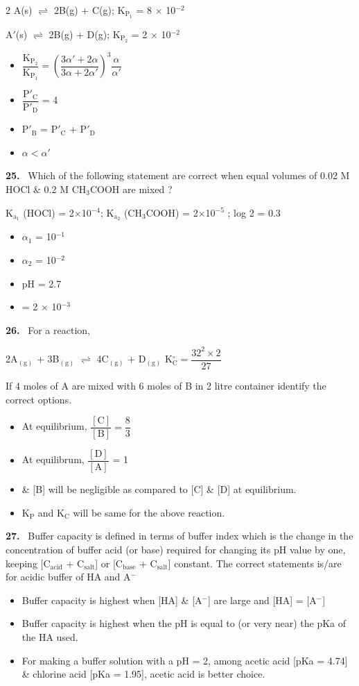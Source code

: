 \documentclass[10pt]{extarticle}
\newcommand{\qn}[1]{\par\smallskip\noindent\textbf{#1.}~}
\newenvironment{qoptions}{\begin{itemize}[leftmargin=1.8em,itemsep=1pt,topsep=2pt,label={}]}{\end{itemize}}
\newcommand{\opt}[2]{\item[(#1)] #2}
\begin{document}
\begin{multicols}{2}
A(s) $\rightleftharpoons$ 2B(g) + C(g); \quad K$_{\mathrm P_1}$ = 8 $\times$ 10$^{-2}$\par
A$'$(s) $\rightleftharpoons$ 2B(g) + D(g); \quad K$_{\mathrm P_2}$ = 2 $\times$ 10$^{-2}$
\begin{qoptions}
\opt{A}{$\dfrac{\mathrm K_{\mathrm P_2}}{\mathrm K_{\mathrm P_1}}=\left(\dfrac{3\alpha'+2\alpha}{3\alpha+2\alpha'}\right)^3\dfrac\alpha{\alpha'}$}
\opt{B}{$\dfrac{\mathrm P'_\mathrm C}{\mathrm P'_\mathrm D}$ = 4}
\opt{C}{P$'_\mathrm B$ = P$'_\mathrm C$ + P$'_\mathrm D$}
\opt{D}{$\alpha<\alpha'$}
\end{qoptions}
\qn{25} Which of the following statement are correct when equal volumes of 0.02 M HOCl \& 0.2 M CH$_3$COOH are mixed ?\par
K$_{\mathrm a_1}$ (HOCl) = 2$\times$10$^{-4}$; K$_{\mathrm a_2}$ (CH$_3$COOH) = 2$\times$10$^{-5}$ ; log 2 = 0.3
\begin{qoptions}
\opt{A}{$\alpha_1$ = 10$^{-1}$}
\opt{B}{$\alpha_2$ = 10$^{-2}$}
\opt{C}{pH = 2.7}
\opt{D}{[H$^+$] = 2 $\times$ 10$^{-3}$}
\end{qoptions}
\qn{26} For a reaction,\par
2A$_{(\mathrm g)}$ + 3B$_{(\mathrm g)}$ $\rightleftharpoons$ 4C$_{(\mathrm g)}$ + D$_{(\mathrm g)}$ \hfill K$^\circ_\mathrm C=\dfrac{32^2\times2}{27}$\par
If 4 moles of A are mixed with 6 moles of B in 2 litre container identify the correct options.
\begin{qoptions}
\opt{A}{At equilibrium, $\dfrac{[\mathrm C]}{[\mathrm B]}=\dfrac83$}
\opt{B}{At equilibrum, $\dfrac{[\mathrm D]}{[\mathrm A]}$ = 1}
\opt{C}{[A] \& [B] will be negligible as compared to [C] \& [D] at equilibrium.}
\opt{D}{K$_\mathrm P$ and K$_\mathrm C$ will be same for the above reaction.}
\end{qoptions}
\qn{27} Buffer capacity is defined in terms of buffer index which is the change in the concentration of buffer acid (or base) required for changing its pH value by one, keeping [C$_\mathrm{acid}$ + C$_\mathrm{salt}$] or [C$_\mathrm{base}$ + C$_\mathrm{salt}$] constant. The correct statements is/are for acidic buffer of HA and A$^-$
\begin{qoptions}
\opt{A}{Buffer capacity is highest when [HA] \& [A$^-$] are large and [HA] = [A$^-$]}
\opt{B}{Buffer capacity is highest when the pH is equal to (or very near) the pKa of the HA used.}
\opt{C}{For making a buffer solution with a pH = 2, among acetic acid [pKa = 4.74] \& chlorine acid [pKa = 1.95], acetic acid is better choice.}

\end{qoptions}
\end{multicols}
\end{document}
